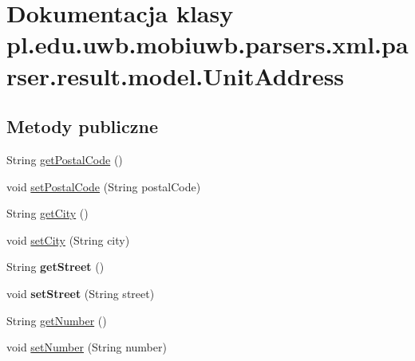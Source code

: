 \hypertarget{classpl_1_1edu_1_1uwb_1_1mobiuwb_1_1parsers_1_1xml_1_1parser_1_1result_1_1model_1_1_unit_address}{}\section{Dokumentacja klasy pl.\+edu.\+uwb.\+mobiuwb.\+parsers.\+xml.\+parser.\+result.\+model.\+Unit\+Address}
\label{classpl_1_1edu_1_1uwb_1_1mobiuwb_1_1parsers_1_1xml_1_1parser_1_1result_1_1model_1_1_unit_address}
\subsection*{Metody publiczne}
\begin{DoxyCompactItemize}
\item 
String \hyperlink{classpl_1_1edu_1_1uwb_1_1mobiuwb_1_1parsers_1_1xml_1_1parser_1_1result_1_1model_1_1_unit_address_aa669806a347e05824d498f4027129ce1}{get\+Postal\+Code} ()
\item 
void \hyperlink{classpl_1_1edu_1_1uwb_1_1mobiuwb_1_1parsers_1_1xml_1_1parser_1_1result_1_1model_1_1_unit_address_a9e8620f428205ee1d9f32f54a6c52efe}{set\+Postal\+Code} (String postal\+Code)
\item 
String \hyperlink{classpl_1_1edu_1_1uwb_1_1mobiuwb_1_1parsers_1_1xml_1_1parser_1_1result_1_1model_1_1_unit_address_a7ccc4d12b46c1cc21094b9be4e982ca0}{get\+City} ()
\item 
void \hyperlink{classpl_1_1edu_1_1uwb_1_1mobiuwb_1_1parsers_1_1xml_1_1parser_1_1result_1_1model_1_1_unit_address_acb68d3d5408629bec5adc2f40c5b12f9}{set\+City} (String city)
\item 
\hypertarget{classpl_1_1edu_1_1uwb_1_1mobiuwb_1_1parsers_1_1xml_1_1parser_1_1result_1_1model_1_1_unit_address_aa6303f1407f1f2309f98ae2ec17f8d26}{}String {\bfseries get\+Street} ()\label{classpl_1_1edu_1_1uwb_1_1mobiuwb_1_1parsers_1_1xml_1_1parser_1_1result_1_1model_1_1_unit_address_aa6303f1407f1f2309f98ae2ec17f8d26}

\item 
\hypertarget{classpl_1_1edu_1_1uwb_1_1mobiuwb_1_1parsers_1_1xml_1_1parser_1_1result_1_1model_1_1_unit_address_a7f915aaa337466e5df8d476c181b46d1}{}void {\bfseries set\+Street} (String street)\label{classpl_1_1edu_1_1uwb_1_1mobiuwb_1_1parsers_1_1xml_1_1parser_1_1result_1_1model_1_1_unit_address_a7f915aaa337466e5df8d476c181b46d1}

\item 
String \hyperlink{classpl_1_1edu_1_1uwb_1_1mobiuwb_1_1parsers_1_1xml_1_1parser_1_1result_1_1model_1_1_unit_address_afbb0fc4ded86f55f68ad35ced3e55d3f}{get\+Number} ()
\item 
void \hyperlink{classpl_1_1edu_1_1uwb_1_1mobiuwb_1_1parsers_1_1xml_1_1parser_1_1result_1_1model_1_1_unit_address_a0956a954182ec912b69033b19ad03453}{set\+Number} (String number)
\end{DoxyCompactItemize}


